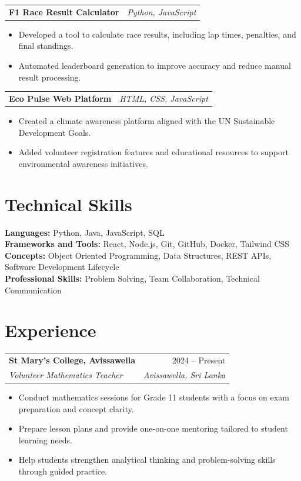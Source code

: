 \documentclass[letterpaper,10pt]{article}
\makeatletter
\newcommand{\resumeSubheading}[4]{
  \begin{tabular*}{\textwidth}{l@{\extracolsep{\fill}}r}
    \textbf{#1} & #2 \\
    \textit{#3} & \textit{#4} \\
  \end{tabular*}\vspace{-4pt}
}
\newcommand{\resumeProjectHeading}[2]{
  \begin{tabular*}{\textwidth}{l@{\extracolsep{\fill}}r}
    \textbf{#1} & \textit{#2} \\
  \end{tabular*}\vspace{-4pt}
}
\makeatother
\begin{document}
\resumeProjectHeading{F1 Race Result Calculator}{Python, JavaScript}
\begin{itemize}
  \item Developed a tool to calculate race results, including lap times, penalties, and final standings.
  \item Automated leaderboard generation to improve accuracy and reduce manual result processing.
\end{itemize}

\resumeProjectHeading{Eco Pulse Web Platform}{HTML, CSS, JavaScript}
\begin{itemize}
  \item Created a climate awareness platform aligned with the UN Sustainable Development Goals.
  \item Added volunteer registration features and educational resources to support environmental awareness initiatives.
\end{itemize}

\section{Technical Skills}
\textbf{Languages:} Python, Java, JavaScript, SQL \\
\textbf{Frameworks and Tools:} React, Node.js, Git, GitHub, Docker, Tailwind CSS \\
\textbf{Concepts:} Object Oriented Programming, Data Structures, REST APIs, Software Development Lifecycle \\
\textbf{Professional Skills:} Problem Solving, Team Collaboration, Technical Communication

\section{Experience}
\resumeSubheading
  {St Mary's College, Avissawella}{2024 -- Present}
  {Volunteer Mathematics Teacher}{Avissawella, Sri Lanka}
\begin{itemize}
  \item Conduct mathematics sessions for Grade 11 students with a focus on exam preparation and concept clarity.
  \item Prepare lesson plans and provide one-on-one mentoring tailored to student learning needs.
  \item Help students strengthen analytical thinking and problem-solving skills through guided practice.
\end{itemize}
\end{document}
